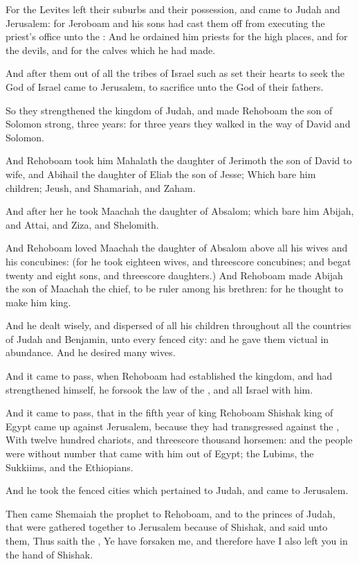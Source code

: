 \Verse For the Levites left their suburbs and their possession, and came to Judah and Jerusalem: for Jeroboam and his sons had cast them off from executing the priest's office unto the \LORD: \Verse And he ordained him priests for the high places, and for the devils, and for the calves which he had made.

\Verse And after them out of all the tribes of Israel such as set their hearts to seek the \LORD God of Israel came to Jerusalem, to sacrifice unto the \LORD God of their fathers.

\Verse So they strengthened the kingdom of Judah, and made Rehoboam the son of Solomon strong, three years: for three years they walked in the way of David and Solomon.

\Verse And Rehoboam took him Mahalath the daughter of Jerimoth the son of David to wife, and Abihail the daughter of Eliab the son of Jesse; \Verse Which bare him children; Jeush, and Shamariah, and Zaham.

\Verse And after her he took Maachah the daughter of Absalom; which bare him Abijah, and Attai, and Ziza, and Shelomith.

\Verse And Rehoboam loved Maachah the daughter of Absalom above all his wives and his concubines: (for he took eighteen wives, and threescore concubines; and begat twenty and eight sons, and threescore daughters.)  \Verse And Rehoboam made Abijah the son of Maachah the chief, to be ruler among his brethren: for he thought to make him king.

\Verse And he dealt wisely, and dispersed of all his children throughout all the countries of Judah and Benjamin, unto every fenced city: and he gave them victual in abundance. And he desired many wives.


\Chapter
\Verse And it came to pass, when Rehoboam had established the kingdom, and had strengthened himself, he forsook the law of the \LORD, and all Israel with him.

\Verse And it came to pass, that in the fifth year of king Rehoboam Shishak king of Egypt came up against Jerusalem, because they had transgressed against the \LORD, \Verse With twelve hundred chariots, and threescore thousand horsemen: and the people were without number that came with him out of Egypt; the Lubims, the Sukkiims, and the Ethiopians.

\Verse And he took the fenced cities which pertained to Judah, and came to Jerusalem.

\Verse Then came Shemaiah the prophet to Rehoboam, and to the princes of Judah, that were gathered together to Jerusalem because of Shishak, and said unto them, Thus saith the \LORD, Ye have forsaken me, and therefore have I also left you in the hand of Shishak.

